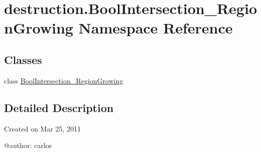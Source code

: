 \hypertarget{namespacedestruction_1_1_bool_intersection___region_growing}{\section{destruction.\-Bool\-Intersection\-\_\-\-Region\-Growing Namespace Reference}
\label{namespacedestruction_1_1_bool_intersection___region_growing}
}
\subsection*{Classes}
\begin{DoxyCompactItemize}
\item 
class \hyperlink{classdestruction_1_1_bool_intersection___region_growing_1_1_bool_intersection___region_growing}{Bool\-Intersection\-\_\-\-Region\-Growing}
\end{DoxyCompactItemize}


\subsection{Detailed Description}
\begin{DoxyVerb}Created on Mar 25, 2011

@author: carlos
\end{DoxyVerb}
 